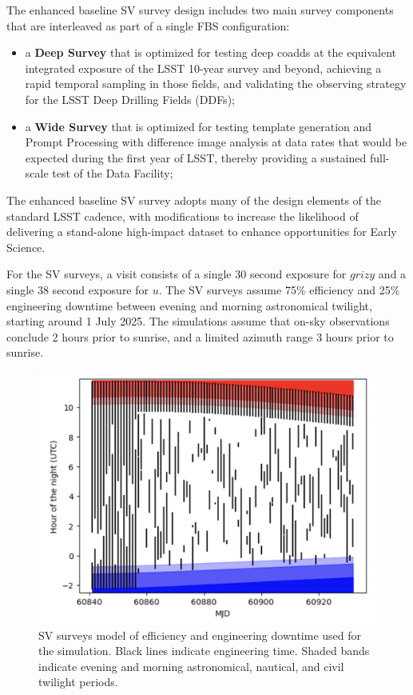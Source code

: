 The enhanced baseline SV survey design includes two main survey components that are interleaved as part of a single FBS configuration:
\begin{itemize}
        \item a \textbf{Deep Survey} that is optimized for testing deep coadds at the equivalent integrated exposure of the LSST 10-year survey and beyond, achieving a rapid temporal sampling in those fields, and validating the observing strategy for the LSST Deep Drilling Fields (DDFs);
        \item a \textbf{Wide Survey} that is optimized for testing template generation and Prompt Processing with difference image analysis at data rates that would be expected during the first year of LSST, thereby providing a sustained full-scale test of the Data Facility;
\end{itemize}
The enhanced baseline SV survey adopts many of the design elements of the standard LSST cadence, with modifications to increase the likelihood of delivering a stand-alone high-impact dataset to enhance opportunities for Early Science.

For the SV surveys, a visit consists of a single 30 second exposure for $grizy$ and a single 38 second exposure for $u$.
The SV surveys assume 75\% efficiency and 25\% engineering downtime between evening and morning astronomical twilight, starting around 1 July 2025.
The simulations assume that on-sky observations conclude 2 hours prior to sunrise, and a limited azimuth range 3 hours prior to sunrise.


\begin{figure}[htbp]
    \begin{center}
    \includegraphics[width=1\textwidth]{./sv_surveys_uptime.png}
    \caption{SV surveys model of efficiency and engineering downtime used for the simulation. Black lines indicate engineering time. Shaded bands indicate evening and morning astronomical, nautical, and civil twilight periods.}
    \label{sv_surveys_uptime}
    \end{center}
\end{figure}

